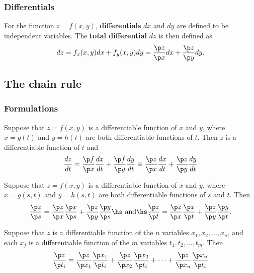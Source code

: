 \documentclass{article}
\begin{document}
\subsubsection{Differentials}

\begin{definition}
    For the function $z=f(x,y)$, \textbf{differentials} $dx$ and $dy$ are
    defined to be independent variables. The \textbf{total differential} $dz$
    is then defined as
    \begin{align*}
        dz = f_x(x,y)dx + f_y(x,y)dy
        = \frac{\p z}{\p x}dx + \frac{\p z}{\p y}dy.
    \end{align*}
\end{definition}


\subsection{The chain rule}


\subsubsection{Formulations}

\begin{theorem}
    Suppose that $z=f(x,y)$ is a differentiable function of $x$ and $y$,
    where $x=g(t)$ and $y=h(t)$ are both differentiable functions of $t$.
    Then $z$ is a differentiable function of $t$ and
    \begin{align*}
        \frac{dz}{dt}=
        \frac{\p f}{\p x}\frac{dx}{dt}+\frac{\p f}{\p y}\frac{dy}{dt}
        \equiv \frac{\p z}{\p x}\frac{dx}{dt}+\frac{\p z}{\p y}\frac{dy}{dt}
    \end{align*}
\end{theorem}
\begin{theorem}
    Suppose that $z=f(x,y)$ is a differentiable function of $x$ and $y$,
    where $x=g(s,t)$ and $y=h(s,t)$ are both differentiable functions of
    $s$ and $t$. Then
    \begin{align*}
        \frac{\p z}{\p s}=\frac{\p z}{\p x}\frac{\p x}{\p s}
        + \frac{\p z}{\p y}\frac{\p y}{\p s}
        \text{\hs and\hs}
        \frac{\p z}{\p t}=\frac{\p z}{\p x}\frac{\p x}{\p t}
        + \frac{\p z}{\p y}\frac{\p y}{\p t}.
    \end{align*}
\end{theorem}
\begin{theorem}
    Suppose that $z$ is a differentiable function of the $n$ variables
    $x_1, x_2, ..., x_n$, and each $x_j$ is a differentiable function of
    the $m$ variables $t_1,t_2, ...,t_m$. Then
    \begin{align*}
        \frac{\p z}{\p t_i}=
        \frac{\p z}{\p x_1}\frac{\p x_1}{\p t_i}
        + \frac{\p z}{\p x_2}\frac{\p x_2}{\p t_i}
        + \cdots
        + \frac{\p z}{\p x_n}\frac{\p x_n}{\p t_i}
    \end{align*}
\end{theorem}
\end{document}
